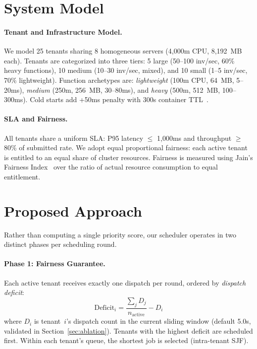\documentclass[runningheads]{llncs}
\begin{document}
\section{System Model}\label{sec:model}

\paragraph{Tenant and Infrastructure Model.}
We model 25 tenants sharing 8 homogeneous servers (4,000m CPU, 8,192~MB each). Tenants are categorized into three tiers: 5 large (50--100 inv/sec, 60\% heavy functions), 10 medium (10--30 inv/sec, mixed), and 10 small (1--5 inv/sec, 70\% lightweight). Function archetypes are: \emph{lightweight} (100m CPU, 64~MB, 5--20ms), \emph{medium} (250m, 256~MB, 30--80ms), and \emph{heavy} (500m, 512~MB, 100--300ms). Cold starts add +50ms penalty with 300s container TTL~\cite{wang2018peeking}.

\paragraph{SLA and Fairness.}
All tenants share a uniform SLA: P95 latency $\leq$ 1,000ms and throughput $\geq$ 80\% of submitted rate. We adopt equal proportional fairness: each active tenant is entitled to an equal share of cluster resources. Fairness is measured using Jain's Fairness Index~\cite{jain1984quantitative} over the ratio of actual resource consumption to equal entitlement.

\section{Proposed Approach}\label{sec:approach}

Rather than computing a single priority score, our scheduler operates in two distinct phases per scheduling round.

\paragraph{Phase 1: Fairness Guarantee.}
Each active tenant receives exactly one dispatch per round, ordered by \emph{dispatch deficit}:
\begin{equation}\label{eq:deficit}
    \text{Deficit}_i = \frac{\sum_{j} D_j}{n_{\text{active}}} - D_i
\end{equation}
where $D_i$ is tenant~$i$'s dispatch count in the current sliding window (default 5.0s, validated in Section~\ref{sec:ablation}). Tenants with the highest deficit are scheduled first. Within each tenant's queue, the shortest job is selected (intra-tenant SJF).
\end{document}
